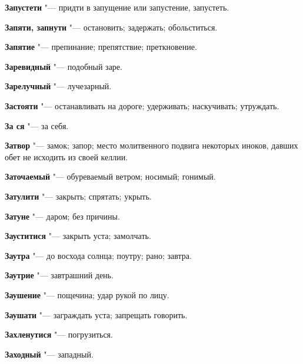 \begin{mymulticols}{2}
\noindent\textbf{Запустети} "--- придти в запущение или запустение, запустеть. 




\noindent\textbf{Запяти, запнути} "--- остановить; задержать; обольститься. 




\noindent\textbf{Запятие} "--- препинание; препятствие; преткновение. 




\noindent\textbf{Заревидный} "--- подобный заре. 




\noindent\textbf{Зарелучный} "--- лучезарный. 




\noindent\textbf{Застояти} "--- останавливать на дороге; удерживать; наскучивать; утруждать. 




\noindent\textbf{За ся} "--- за себя. 




\noindent\textbf{Затвор} "--- замок; запор; место молитвенного подвига некоторых иноков, давших обет не исходить из своей келлии. 




\noindent\textbf{Заточаемый} "--- обуреваемый ветром; носимый; гонимый. 




\noindent\textbf{Затулити} "--- закрыть; спрятать; укрыть. 




\noindent\textbf{Затуне} "--- даром; без причины. 




\noindent\textbf{Зауститися} "--- закрыть уста; замолчать. 




\noindent\textbf{Заутра} "--- до восхода солнца; поутру; рано; завтра. 




\noindent\textbf{Заутрие} "--- завтрашний день. 




\noindent\textbf{Заушение} "--- пощечина; удар рукой по лицу. 




\noindent\textbf{Заушати} "--- заграждать уста; запрещать говорить. 




\noindent\textbf{Захленутися} "--- погрузиться. 




\noindent\textbf{Заходный} "--- западный. 





\end{mymulticols}
